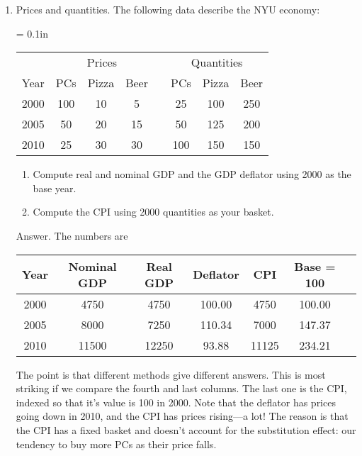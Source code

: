 \begin{enumerate}
\item Prices and quantities.
The following data describe the NYU economy:
\begin{center}
\tabcolsep = 0.1in
\begin{tabular*}{0.8\textwidth}{cccccccc}
\toprule
  & \multicolumn{3}{c}{Prices} &&   \multicolumn{3}{c}{Quantities} \\
  \cmidrule{2-4} \cmidrule{6-8}
Year  &  PCs  &  Pizza  &  Beer  && PCs  &  Pizza  &  Beer  \\
\midrule
2000  &  100 & 10 & 5 && 25 & 100 & 250  \\
2005  &  50  & 20 & 15 && 50 & 125 & 200 \\
2010  &  25  & 30 & 30 && 100 & 150 & 150 \\
\bottomrule
\end{tabular*}
\end{center}
\begin{enumerate}
\item Compute real and nominal GDP and the GDP deflator using
2000 as the base year.
\item Compute the CPI using 2000 quantities as your basket.
\end{enumerate}
Answer.  The numbers are
\begin{center}
\begin{tabular}{ccccccc}
\toprule
Year  &  Nominal GDP & Real GDP & Deflator  & CPI  & Base = 100 \\
\midrule
2000 & 4750  & 4750 & 100.00 &  4750 & 100.00 \\
2005 & 8000 & 7250  & 110.34  & 7000 & 147.37  \\
2010 & 11500  & 12250 & 93.88 & 11125 & 234.21 \\
\bottomrule
\end{tabular}
\end{center}
The point is that different methods give different answers.
This is most striking if we compare the fourth and last columns.
The last one is the CPI, indexed so that it's value is 100 in 2000.
Note that the deflator has prices going down in 2010,
and the CPI has prices rising---a lot!
The reason is that the CPI has a fixed basket and doesn't account for the substitution effect:
our tendency to buy more PCs as their price falls.



\end{enumerate}
